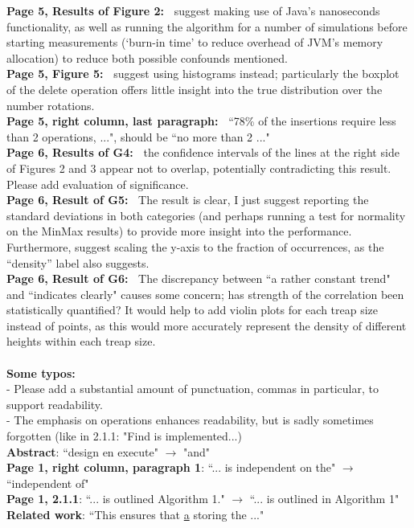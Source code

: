 \documentclass[11pt,a4paper,oneside,fleqn]{article}
\begin{document}
\textbf{Page 5, Results of Figure 2:~} suggest making use of Java's nanoseconds functionality, as well as running the algorithm for a number of simulations before starting measurements (`burn-in time' to reduce overhead of JVM's memory allocation) to reduce both possible confounds mentioned. \\
\textbf{Page 5, Figure 5:~} suggest using histograms instead; particularly the boxplot of the delete operation offers little insight into the true distribution over the number rotations. \\
\textbf{Page 5, right column, last paragraph:~} ``78\% of the insertions require less than 2 operations, ...", should be ``no more than 2 ..." \\
\textbf{Page 6, Results of G4:~} the confidence intervals of the lines at the right side of Figures 2 and 3 appear not to overlap, potentially contradicting this result. Please add evaluation of significance. \\
\textbf{Page 6, Result of G5:~} The result is clear, I just suggest reporting the standard deviations in both categories (and perhaps running a test for normality on the MinMax results) to provide more insight into the performance. Furthermore, suggest scaling the y-axis to the fraction of occurrences, as the ``density'' label also suggests. \\
\textbf{Page 6, Result of G6:~} The discrepancy between ``a rather constant trend" and ``indicates clearly" causes some concern; has strength of the correlation been statistically quantified? It would help to add violin plots for each treap size instead of points, as this would more accurately represent the density of different heights within each treap size. \\ \\
\textbf{Some typos:} ~\\
- Please add a substantial amount of punctuation, commas in particular, to support readability. \\
- The emphasis on operations enhances readability, but is sadly sometimes forgotten (like in 2.1.1: "Find is implemented...) \\
\textbf{Abstract}: ``design en execute" $\to$ "and" \\
\textbf{Page 1, right column, paragraph 1}: ``... is independent on the" $\to$ ``independent of" \\
\textbf{Page 1, 2.1.1}: ``... is outlined Algorithm 1." $\to$ ``... is outlined in Algorithm 1" \\
\textbf{Related work}: ``This ensures that \underline{a} storing the ..." \\
\end{document}
